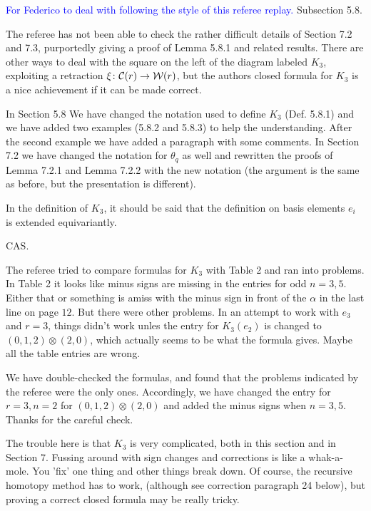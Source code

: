 \textcolor{blue}{For Federico to deal with following the style of this referee replay.} Subsection 5.8. 

    \subitem The referee has not been able to check the rather difficult details of Section 7.2 and 7.3, purportedly giving a proof of Lemma 5.8.1 and related results. There are other ways to deal with the square on the left of the diagram labeled $K_3$, exploiting a retraction $\xi\colon \mathcal{C}(r)\to \mathcal{W}(r)$, but the authors closed formula for $K_3$ is a nice achievement if it can be made correct.

    \ar In Section 5.8 We have changed the notation used to define $K_3$ (Def. 5.8.1) and we have added two examples (5.8.2 and 5.8.3) to help the understanding. After the second example we have added a paragraph with some comments. In Section 7.2 we have changed the notation for $\theta_q$ as well and rewritten the proofs of Lemma 7.2.1 and Lemma 7.2.2 with the new notation (the argument is the same as before, but the presentation is different). 

    \subitem In the definition of $K_3$, it should be said that the definition on basis elements $e_i$ is extended equivariantly.

    \ar CAS.

    \subitem The referee tried to compare formulas for $K_3$ with Table 2 and ran into problems. In Table 2 it looks like minus signs are missing in the entries for odd $n=3,5$. Either that or something is amiss with the minus sign in front of the $\alpha$ in the last line on page $12$. But there were other problems. In an attempt to work with $e_3$ and $r=3$, things didn't work unles the entry for $K_3(e_2)$ is changed to $(0,1,2)\otimes (2,0)$, which actually seems to be what the formula gives. Maybe all the table entries are wrong.

    \ar We have double-checked the formulas, and found that the problems indicated by the referee were the only ones. Accordingly, we have changed the entry for $r=3,n=2$ for $(0,1,2)\otimes (2,0)$ and added the minus signs when $n=3,5$. Thanks for the careful check.

    \subitem The trouble here is that $K_3$ is very complicated, both in this section and in Section 7. Fussing around with sign changes and corrections is like a whak-a-mole. You 'fix' one thing and other things break down. Of course, the recursive homotopy method has to work, (although see correction paragraph 24 below), but proving a correct closed formula may be really tricky.

    \ar 



